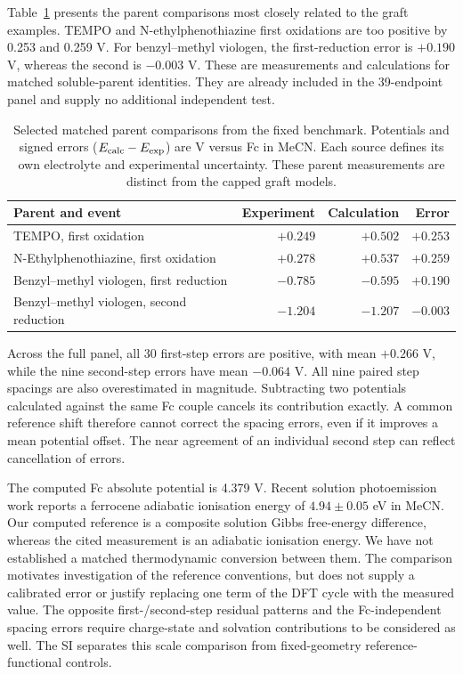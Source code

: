 \documentclass[11pt]{article}
\begin{document}
Table~\ref{tab:matchedparents} presents the parent comparisons most closely related to the graft examples. TEMPO and N-ethylphenothiazine first oxidations are too positive by 0.253 and 0.259 V. For benzyl--methyl viologen, the first-reduction error is $+0.190$ V, whereas the second is $-0.003$ V. These are measurements and calculations for matched soluble-parent identities. They are already included in the 39-endpoint panel and supply no additional independent test.
\begin{table}[htbp]\centering\small
\caption{Selected matched parent comparisons from the fixed benchmark. Potentials and signed errors ($E_{\rm calc}-E_{\rm exp}$) are V versus Fc in MeCN. Each source defines its own electrolyte and experimental uncertainty. These parent measurements are distinct from the capped graft models.}
\label{tab:matchedparents}
\begin{tabular}{p{.43\linewidth}rrr}\toprule
Parent and event & Experiment & Calculation & Error\\\midrule
TEMPO, first oxidation\cite{gerken2015tempo} & $+0.249$ & $+0.502$ & $+0.253$\\
N-Ethylphenothiazine, first oxidation\cite{attanayake2019} & $+0.278$ & $+0.537$ & $+0.259$\\
Benzyl--methyl viologen, first reduction\cite{kim2022} & $-0.785$ & $-0.595$ & $+0.190$\\
Benzyl--methyl viologen, second reduction\cite{kim2022} & $-1.204$ & $-1.207$ & $-0.003$\\\bottomrule
\end{tabular}\end{table}

Across the full panel, all 30 first-step errors are positive, with mean $+0.266$ V, while the nine second-step errors have mean $-0.064$ V. All nine paired step spacings are also overestimated in magnitude. Subtracting two potentials calculated against the same Fc couple cancels its contribution exactly. A common reference shift therefore cannot correct the spacing errors, even if it improves a mean potential offset. The near agreement of an individual second step can reflect cancellation of errors.

The computed Fc absolute potential is 4.379 V. Recent solution photoemission work reports a ferrocene adiabatic ionisation energy of $4.94\pm0.05$ eV in MeCN.\cite{baikie2026fc} Our computed reference is a composite solution Gibbs free-energy difference, whereas the cited measurement is an adiabatic ionisation energy. We have not established a matched thermodynamic conversion between them. The comparison motivates investigation of the reference conventions, but does not supply a calibrated error or justify replacing one term of the DFT cycle with the measured value. The opposite first-/second-step residual patterns and the Fc-independent spacing errors require charge-state and solvation contributions to be considered as well. The SI separates this scale comparison from fixed-geometry reference-functional controls.
\end{document}
